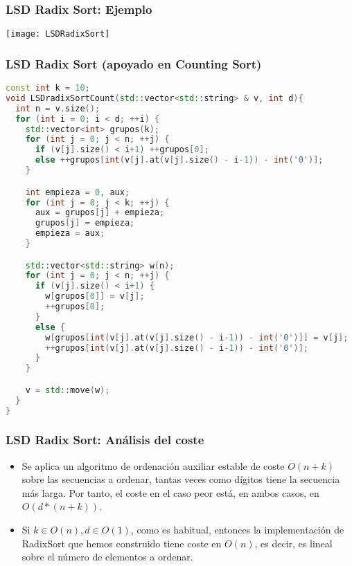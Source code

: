 \documentclass{beamer}
\begin{document}
\begin{frame}
\frametitle{LSD Radix Sort: Ejemplo}
\texttt{[image: LSDRadixSort]}
\end{frame}

\begin{frame}[fragile]
\frametitle{LSD Radix Sort (apoyado en Counting Sort)}
\begin{lstlisting}[language = C++, basicstyle=\ttfamily\tiny]
const int k = 10;
void LSDradixSortCount(std::vector<std::string> & v, int d){ 
  int n = v.size();
  for (int i = 0; i < d; ++i) {
    std::vector<int> grupos(k);
    for (int j = 0; j < n; ++j) {
      if (v[j].size() < i+1) ++grupos[0];
      else ++grupos[int(v[j].at(v[j].size() - i-1)) - int('0')];
    }

    int empieza = 0, aux;
    for (int j = 0; j < k; ++j) {
      aux = grupos[j] + empieza;   
      grupos[j] = empieza;         
      empieza = aux;
    }

    std::vector<std::string> w(n);
    for (int j = 0; j < n; ++j) {
      if (v[j].size() < i+1) {
        w[grupos[0]] = v[j];
        ++grupos[0];
      }
      else {
        w[grupos[int(v[j].at(v[j].size() - i-1)) - int('0')]] = v[j]; 
        ++grupos[int(v[j].at(v[j].size() - i-1)) - int('0')];         
      }
    }

    v = std::move(w);
  }
}
\end{lstlisting}
\end{frame}

\begin{frame}
\frametitle{LSD Radix Sort: Análisis del coste}
\begin{itemize}
	\item Se aplica un algoritmo de ordenación auxiliar estable de coste $O(n+k)$ sobre las secuencias a ordenar, tantas veces como dígitos tiene la secuencia más larga. Por tanto, el coste en el caso peor está, en ambos casos, en $O(d*(n+k))$.
	\item Si $k\in O(n), d\in O(1)$, como es habitual, entonces la implementación de RadixSort que hemos construido tiene coste en $O(n)$, es decir, es lineal sobre el número de elementos a ordenar.
\end{itemize}

\end{frame}
\end{document}

